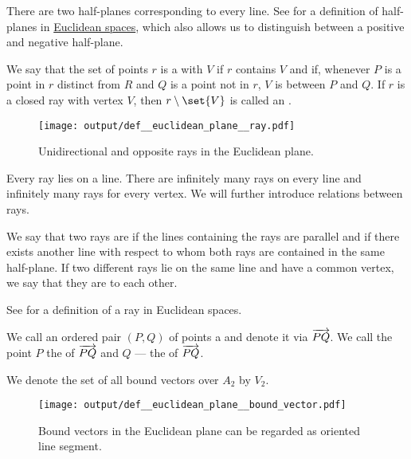 \begin{definition}
\begin{thmenum}
    There are two half-planes corresponding to every line. See  for a definition of half-planes in \hyperref[def:euclidean_space]{Euclidean spaces}, which also allows us to distinguish between a positive and negative half-plane.

     We say that the set of points \( r \) is a  with  \( V \) if \( r \) contains \( V \) and if, whenever \( P \) is a point in \( r \) distinct from \( R \) and \( Q \) is a point not in \( r \), \( V \) is between \( P \) and \( Q \). If \( r \) is a closed ray with vertex \( V \), then \( r \setminus \set{ V } \) is called an .

    \begin{figure}[!ht]
      \centering
      \texttt{[image: output/def\_\_euclidean\_plane\_\_ray.pdf]}
      \caption{Unidirectional and opposite rays in the Euclidean plane.}\label{fig:def:euclidean_plane/ray}
    \end{figure}

    Every ray lies on a line. There are infinitely many rays on every line and infinitely many rays for every vertex. We will further introduce relations between rays.

    We say that two rays are  if the lines containing the rays are parallel and if there exists another line with respect to whom both rays are contained in the same half-plane. If two different rays lie on the same line and have a common vertex, we say that they are  to each other.

    See  for a definition of a ray in Euclidean spaces.

     We call an ordered pair \( (P, Q) \) of points a  and denote it via \( \overrightarrow{PQ} \). We call the point \( P \) the  of \( \overrightarrow{PQ} \) and \( Q \) --- the  of \( \overrightarrow{PQ} \).

    We denote the set of all bound vectors over \( A_2 \) by \( V_2 \).

    \begin{figure}[!ht]
      \centering
      \texttt{[image: output/def\_\_euclidean\_plane\_\_bound\_vector.pdf]}
      \caption{Bound vectors in the Euclidean plane can be regarded as oriented line segment.}\label{fig:def:euclidean_plane/bound_vector}
    \end{figure}
  \end{thmenum}
\end{definition}

